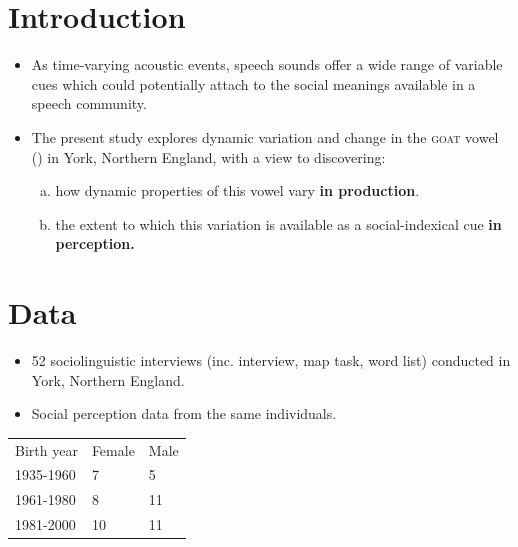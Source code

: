 \documentclass[a0,final]{a0poster}
\begin{document}
\begin{multicols*}{4}							%
			\raggedcolumns			%
\section*{Introduction}
\begin{itemize}
 \item{As time-varying acoustic events, speech sounds offer a wide range of variable cues which could potentially attach to the social meanings available in a speech community.} 
 \item{The present study explores dynamic variation and change in the \textsc{goat} vowel () in York, Northern England, with a view to discovering:\vspace*{.5cm} \begin{enumerate}[(a)]\item{how dynamic properties of this vowel vary \textbf{in production}.}\vspace*{.5cm}\item{the extent to which this variation is available as a social-indexical cue \textbf{in perception.}}\end{enumerate}}
\end{itemize}
\vspace{-1cm}
\section*{Data}
\begin{itemize}
\item{52 sociolinguistic interviews (inc. interview, map task, word list) conducted in York, Northern England.}
\item{Social perception data from the same individuals.}
\end{itemize}
\vspace*{0.5cm}
\begin{table}[H]
\centering
\begin{tabular}{l|l|l}
Birth year&Female & Male \\
1935-1960 &7 &5\\
 1961-1980& 8 & 11\\
1981-2000& 10 &11\\
\end{tabular}
  \end{table}

\end{multicols*}
\end{document}
